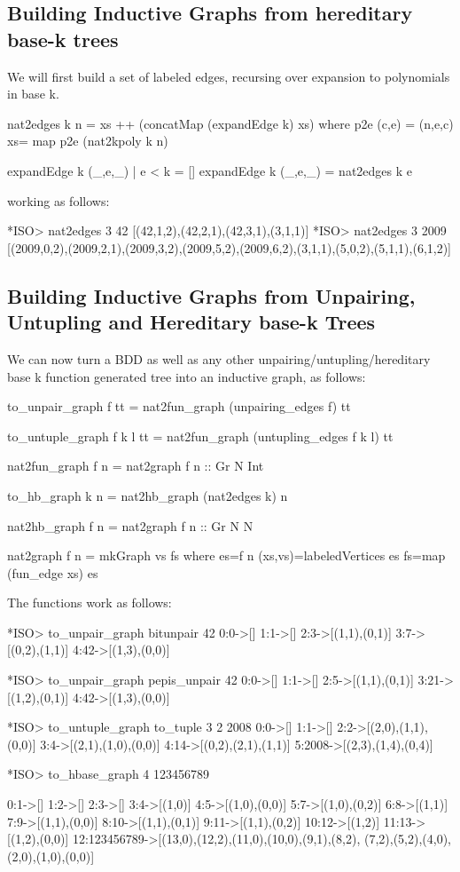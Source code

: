 \documentclass[]{INCLUDES/llncs}
\begin{document}
\subsection*{Building Inductive Graphs from hereditary base-k trees}
We will first build a set of labeled edges, recursing over expansion to
polynomials in base k.

\begin{code}
nat2edges k n = xs ++ (concatMap (expandEdge k) xs) where 
  p2e (c,e) = (n,e,c)
  xs= map p2e (nat2kpoly k n)

expandEdge k (_,e,_) | e < k = []
expandEdge k (_,e,_) = nat2edges k e
\end{code}
working as follows:
\begin{codex}
*ISO> nat2edges 3 42
[(42,1,2),(42,2,1),(42,3,1),(3,1,1)]
*ISO> nat2edges 3 2009
[(2009,0,2),(2009,2,1),(2009,3,2),(2009,5,2),(2009,6,2),(3,1,1),(5,0,2),(5,1,1),(6,1,2)]
\end{codex}

\subsection*{Building Inductive Graphs from Unpairing, Untupling and
Hereditary base-k Trees}

We can now turn a BDD as well as any other unpairing/untupling/hereditary base k
function generated tree into an inductive graph, as follows:
\begin{code}
to_unpair_graph f tt = nat2fun_graph (unpairing_edges f) tt

to_untuple_graph f k l tt = nat2fun_graph (untupling_edges f k l) tt

nat2fun_graph f n = nat2graph f n :: Gr N Int

to_hb_graph k n = nat2hb_graph (nat2edges k) n

nat2hb_graph f n = nat2graph f n :: Gr N N

nat2graph f n = mkGraph vs fs where
  es=f n
  (xs,vs)=labeledVertices es
  fs=map (fun_edge xs) es
\end{code}
The functions work as follows:
\begin{codex}
*ISO> to_unpair_graph bitunpair 42
0:0->[]
1:1->[]
2:3->[(1,1),(0,1)]
3:7->[(0,2),(1,1)]
4:42->[(1,3),(0,0)]

*ISO> to_unpair_graph pepis_unpair 42
0:0->[]
1:1->[]
2:5->[(1,1),(0,1)]
3:21->[(1,2),(0,1)]
4:42->[(1,3),(0,0)]

*ISO> to_untuple_graph to_tuple 3 2 2008
0:0->[]
1:1->[]
2:2->[(2,0),(1,1),(0,0)]
3:4->[(2,1),(1,0),(0,0)]
4:14->[(0,2),(2,1),(1,1)]
5:2008->[(2,3),(1,4),(0,4)]

*ISO> to_hbase_graph 4 123456789

0:1->[]
1:2->[]
2:3->[]
3:4->[(1,0)]
4:5->[(1,0),(0,0)]
5:7->[(1,0),(0,2)]
6:8->[(1,1)]
7:9->[(1,1),(0,0)]
8:10->[(1,1),(0,1)]
9:11->[(1,1),(0,2)]
10:12->[(1,2)]
11:13->[(1,2),(0,0)]
12:123456789->[(13,0),(12,2),(11,0),(10,0),(9,1),(8,2),
               (7,2),(5,2),(4,0),(2,0),(1,0),(0,0)]
\end{codex}
\end{document}
